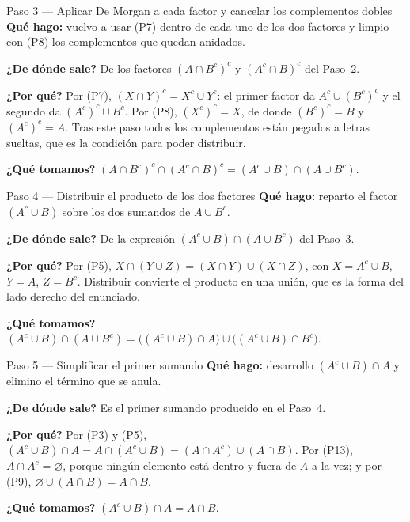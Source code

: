 \documentclass[11pt]{article}
\begin{document}
\begin{paso}{Paso 3 --- Aplicar De Morgan a cada factor y cancelar los complementos dobles}
\textbf{Qué hago:} vuelvo a usar (P7) dentro de cada uno de los dos factores y limpio con (P8)
los complementos que quedan anidados.

\textbf{¿De dónde sale?} De los factores $(A\cap B^{c})^{c}$ y $(A^{c}\cap B)^{c}$ del Paso~2.

\textbf{¿Por qué?} Por (P7), $(X\cap Y)^{c}=X^{c}\cup Y^{c}$: el primer factor da
$A^{c}\cup(B^{c})^{c}$ y el segundo da $(A^{c})^{c}\cup B^{c}$. Por (P8), $(X^{c})^{c}=X$, de
donde $(B^{c})^{c}=B$ y $(A^{c})^{c}=A$. Tras este paso todos los complementos están pegados a
letras sueltas, que es la condición para poder distribuir.

\textbf{¿Qué tomamos?}
$(A\cap B^{c})^{c}\cap(A^{c}\cap B)^{c}=(A^{c}\cup B)\cap(A\cup B^{c})$.
\end{paso}

\begin{paso}{Paso 4 --- Distribuir el producto de los dos factores}
\textbf{Qué hago:} reparto el factor $(A^{c}\cup B)$ sobre los dos sumandos de $A\cup B^{c}$.

\textbf{¿De dónde sale?} De la expresión $(A^{c}\cup B)\cap(A\cup B^{c})$ del Paso~3.

\textbf{¿Por qué?} Por (P5), $X\cap(Y\cup Z)=(X\cap Y)\cup(X\cap Z)$, con $X=A^{c}\cup B$,
$Y=A$, $Z=B^{c}$. Distribuir convierte el producto en una unión, que es la forma del lado
derecho del enunciado.

\textbf{¿Qué tomamos?}
$(A^{c}\cup B)\cap(A\cup B^{c})=\bigl((A^{c}\cup B)\cap A\bigr)\cup\bigl((A^{c}\cup B)\cap B^{c}\bigr)$.
\end{paso}

\begin{paso}{Paso 5 --- Simplificar el primer sumando}
\textbf{Qué hago:} desarrollo $(A^{c}\cup B)\cap A$ y elimino el término que se anula.

\textbf{¿De dónde sale?} Es el primer sumando producido en el Paso~4.

\textbf{¿Por qué?} Por (P3) y (P5), $(A^{c}\cup B)\cap A=A\cap(A^{c}\cup B)=(A\cap A^{c})\cup(A\cap B)$.
Por (P13), $A\cap A^{c}=\varnothing$, porque ningún elemento está dentro y fuera de $A$ a la vez;
y por (P9), $\varnothing\cup(A\cap B)=A\cap B$.

\textbf{¿Qué tomamos?} $(A^{c}\cup B)\cap A=A\cap B$.
\end{paso}
\end{document}
